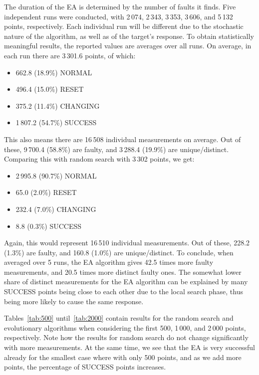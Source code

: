 \documentclass[times, utf8, diplomski]{fer}
\begin{document}
The duration of the EA is determined by the number of faults it finds.
Five independent runs were conducted, with 2\,074, 2\,343, 3\,353, 3\,606,
and 5\,132 points, respectively. Each individual run will be different due
to the stochastic nature of the algorithm, as well as of the target's response.
To obtain statistically meaningful results, the reported values are averages over all runs.
On average, in each run there are 3\,301.6 points, of which:
\begin{itemize}
	\item 662.8  (18.9\%) NORMAL
	\item 496.4  (15.0\%) RESET
	\item 375.2  (11.4\%) CHANGING
	\item 1\,807.2 (54.7\%) SUCCESS
\end{itemize}

This also means there are 16\,508 individual measurements on average.
Out of these, 9\,700.4 (58.8\%) are faulty, and 3\,288.4 (19.9\%) are unique/distinct.
Comparing this with random search with 3\,302 points, we get:
\begin{itemize}
	\item 2\,995.8 (90.7\%) NORMAL
	\item 65.0 (2.0\%) RESET
	\item 232.4 (7.0\%) CHANGING
	\item 8.8 (0.3\%) SUCCESS
\end{itemize}

Again, this would represent 16\,510 individual measurements.
Out of these, 228.2 (1.3\%) are faulty, and 160.8 (1.0\%) are unique/distinct.
To conclude, when averaged over 5 runs, the EA algorithm gives 42.5 times more faulty
measurements, and 20.5 times more distinct faulty ones.
The somewhat lower share of distinct measurements for the EA algorithm
can be explained by many SUCCESS points being close to each other due to the
local search phase, thus being more likely to cause the same response.

Tables~\ref{tab:500} until~\ref{tab:2000} contain results for the random search
and evolutionary algorithms when considering the first 500, 1\,000, and 2\,000
points, respectively. Note how the results for random search do not change
significantly with more measurements. At the same time, we see that the EA is
very successful already for the smallest case where with only 500 points,
and as we add more points, the percentage of SUCCESS points increases.
\end{document}
